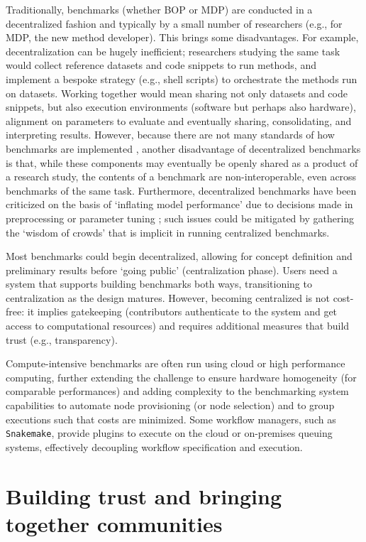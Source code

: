 \documentclass[11pt]{article}
\begin{document}
Traditionally, benchmarks (whether BOP or MDP) are conducted in a decentralized fashion and typically by a small number of researchers (e.g., for MDP, the new method developer). This brings some disadvantages. For example, decentralization can be hugely inefficient; researchers studying the same task would collect reference datasets and code snippets to run methods, and implement a bespoke strategy (e.g., shell scripts) to orchestrate the methods run on datasets. Working together would mean sharing not only datasets and code snippets, but also execution environments (software but perhaps also hardware), alignment on parameters to evaluate and eventually sharing, consolidating, and interpreting results. However, because there are not many standards of how benchmarks are implemented \cite{Sonrel2023-te}, another disadvantage of decentralized benchmarks is that, while these components may eventually be openly shared as a product of a research study, the contents of a benchmark are non-interoperable, even across benchmarks of the same task. Furthermore, decentralized benchmarks have been criticized on the basis of `inflating model performance' due to decisions made in preprocessing or parameter tuning \cite{luecken2025open}; such issues could be mitigated by gathering the `wisdom of crowds' that is implicit in running centralized benchmarks.

Most benchmarks could begin decentralized, allowing for concept definition and preliminary results before `going public' (centralization phase). Users need a system that supports building benchmarks both ways, transitioning to centralization as the design matures. However, becoming centralized is not cost-free: it implies gatekeeping (contributors authenticate to the system and get access to computational resources) and requires additional measures that build trust (e.g., transparency).

Compute-intensive benchmarks are often run using cloud or high performance computing, further extending the challenge to ensure hardware homogeneity (for comparable performances) and adding complexity to the benchmarking system capabilities to automate node provisioning (or node selection) and to group executions such that costs are minimized. Some workflow managers, such as \texttt{Snakemake}, provide plugins to execute on the cloud or on-premises queuing systems, effectively decoupling workflow specification and execution.

\section*{Building trust and bringing together communities}
\end{document}
